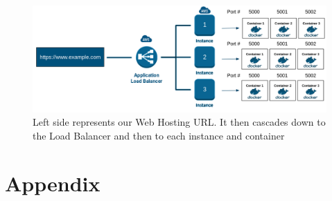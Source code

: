 \documentclass[draftclsnofoot,onecolumn,journal,letterpaper,compsoc,10pt]{IEEEtran}
\begin{document}
        \begin{figure}[h]
            \centering
            \label{fig:my_label}
            \caption{Left side represents our Web Hosting URL. It then cascades down to the Load Balancer and then to each instance and container}
            \includegraphics[width=6.5in]{img/load-balance-architecture.png}
        \end{figure}          
    
\section{Appendix}
\end{document}
